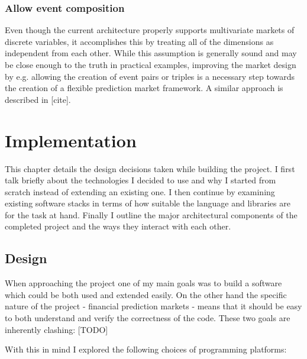 \documentclass[bsc,frontabs,twoside,singlespacing,parskip,deptreport]{infthesis}     %
\begin{document}
\subsection{Allow event composition}

    Even though the current architecture properly supports multivariate markets of discrete variables, it accomplishes this by treating all of the dimensions as independent from each other. While this assumption is generally sound and may be close enough to the truth in practical examples, improving the market design by e.g. allowing the creation of event pairs or triples is a necessary step towards the creation of a flexible prediction market framework. A similar approach is described in [cite]. 
    

\chapter{Implementation}

    This chapter details the design decisions taken while building the project. I first talk briefly about the technologies I decided to use and why I started from scratch instead of extending an existing one. I then continue by examining existing software stacks in terms of how suitable the language and libraries are for the task at hand. Finally I outline the major architectural components of the completed project and the ways they interact with each other.

\section{Design}

    When approaching the project one of my main goals was to build a software which could be both used and extended easily. On the other hand the specific nature of the project - financial prediction markets - means that it should be easy to both understand and verify the correctness of the code. These two goals are inherently clashing: [TODO]
    
With this in mind I explored the following choices of programming platforms:
\end{document}
